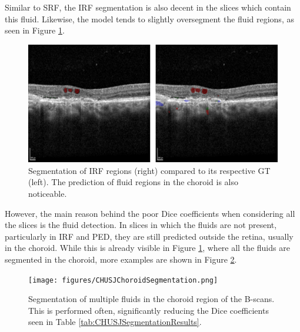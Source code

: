 Similar to SRF, the IRF segmentation is also decent in the slices which contain this fluid. Likewise, the model tends to slightly oversegment the fluid regions, as seen in Figure \ref{fig:CHUSJIRFSegmentation}. 

\begin{figure}[!ht]
	\centering
	\includegraphics[width=0.60\linewidth]{figures/CHUSJIRFSegmentation.png}
	\caption{Segmentation of IRF regions (right) compared to its respective GT (left). The prediction of fluid regions in the choroid is also noticeable.}
	\label{fig:CHUSJIRFSegmentation}
\end{figure}

However, the main reason behind the poor Dice coefficients when considering all the slices is the fluid detection. In slices in which the fluids are not present, particularly in IRF and PED, they are still predicted outside the retina, usually in the choroid. While this is already visible in Figure \ref{fig:CHUSJIRFSegmentation}, where all the fluids are segmented in the choroid, more examples are shown in Figure \ref{fig:CHUSJChoroidSegmentation}.

\begin{figure}[!ht]
	\centering	\texttt{[image: figures/CHUSJChoroidSegmentation.png]}
	\caption{Segmentation of multiple fluids in the choroid region of the B-scans. This is performed often, significantly reducing the Dice coefficients seen in Table \ref{tab:CHUSJSegmentationResults}.}
	\label{fig:CHUSJChoroidSegmentation}
\end{figure}

